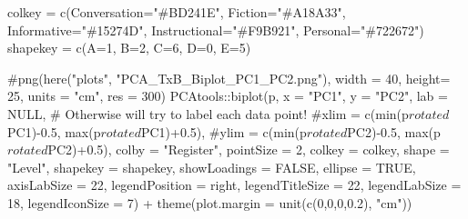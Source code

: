 \documentclass[
  letterpaper,
  DIV=11,
  numbers=noendperiod]{scrreprt}
\newenvironment{Shaded}{\begin{snugshade}}{\end{snugshade}}
\newcommand{\AttributeTok}[1]{\textcolor[rgb]{0.40,0.45,0.13}{#1}}
\newcommand{\CommentTok}[1]{\textcolor[rgb]{0.37,0.37,0.37}{#1}}
\newcommand{\ConstantTok}[1]{\textcolor[rgb]{0.56,0.35,0.01}{#1}}
\newcommand{\DecValTok}[1]{\textcolor[rgb]{0.68,0.00,0.00}{#1}}
\newcommand{\FloatTok}[1]{\textcolor[rgb]{0.68,0.00,0.00}{#1}}
\newcommand{\FunctionTok}[1]{\textcolor[rgb]{0.28,0.35,0.67}{#1}}
\newcommand{\NormalTok}[1]{\textcolor[rgb]{0.00,0.23,0.31}{#1}}
\newcommand{\OtherTok}[1]{\textcolor[rgb]{0.00,0.23,0.31}{#1}}
\newcommand{\SpecialCharTok}[1]{\textcolor[rgb]{0.37,0.37,0.37}{#1}}
\newcommand{\StringTok}[1]{\textcolor[rgb]{0.13,0.47,0.30}{#1}}
\begin{document}
\begin{Shaded}
\begin{Highlighting}[]
\NormalTok{colkey }\OtherTok{=} \FunctionTok{c}\NormalTok{(}\AttributeTok{Conversation=}\StringTok{"\#BD241E"}\NormalTok{, }\AttributeTok{Fiction=}\StringTok{"\#A18A33"}\NormalTok{, }\AttributeTok{Informative=}\StringTok{"\#15274D"}\NormalTok{, }\AttributeTok{Instructional=}\StringTok{"\#F9B921"}\NormalTok{, }\AttributeTok{Personal=}\StringTok{"\#722672"}\NormalTok{)}
\NormalTok{shapekey }\OtherTok{=} \FunctionTok{c}\NormalTok{(}\AttributeTok{A=}\DecValTok{1}\NormalTok{, }\AttributeTok{B=}\DecValTok{2}\NormalTok{, }\AttributeTok{C=}\DecValTok{6}\NormalTok{, }\AttributeTok{D=}\DecValTok{0}\NormalTok{, }\AttributeTok{E=}\DecValTok{5}\NormalTok{)}

\CommentTok{\#png(here("plots", "PCA\_TxB\_Biplot\_PC1\_PC2.png"), width = 40, height= 25, units = "cm", res = 300)}
\NormalTok{PCAtools}\SpecialCharTok{::}\FunctionTok{biplot}\NormalTok{(p,}
                 \AttributeTok{x =} \StringTok{"PC1"}\NormalTok{,}
                 \AttributeTok{y =} \StringTok{"PC2"}\NormalTok{,}
                 \AttributeTok{lab =} \ConstantTok{NULL}\NormalTok{, }\CommentTok{\# Otherwise will try to label each data point!}
                 \CommentTok{\#xlim = c(min(p$rotated$PC1){-}0.5, max(p$rotated$PC1)+0.5),}
                 \CommentTok{\#ylim = c(min(p$rotated$PC2){-}0.5, max(p$rotated$PC2)+0.5),}
                 \AttributeTok{colby =} \StringTok{"Register"}\NormalTok{,}
                 \AttributeTok{pointSize =} \DecValTok{2}\NormalTok{,}
                 \AttributeTok{colkey =}\NormalTok{ colkey,}
                 \AttributeTok{shape =} \StringTok{"Level"}\NormalTok{,}
                 \AttributeTok{shapekey =}\NormalTok{ shapekey,}
                 \AttributeTok{showLoadings =} \ConstantTok{FALSE}\NormalTok{,}
                 \AttributeTok{ellipse =} \ConstantTok{TRUE}\NormalTok{,}
                 \AttributeTok{axisLabSize =} \DecValTok{22}\NormalTok{,}
                 \AttributeTok{legendPosition =} \StringTok{\textquotesingle{}right\textquotesingle{}}\NormalTok{,}
                 \AttributeTok{legendTitleSize =} \DecValTok{22}\NormalTok{,}
                 \AttributeTok{legendLabSize =} \DecValTok{18}\NormalTok{, }
                 \AttributeTok{legendIconSize =} \DecValTok{7}\NormalTok{) }\SpecialCharTok{+}
  \FunctionTok{theme}\NormalTok{(}\AttributeTok{plot.margin =} \FunctionTok{unit}\NormalTok{(}\FunctionTok{c}\NormalTok{(}\DecValTok{0}\NormalTok{,}\DecValTok{0}\NormalTok{,}\DecValTok{0}\NormalTok{,}\FloatTok{0.2}\NormalTok{), }\StringTok{"cm"}\NormalTok{))}
\end{Highlighting}
\end{Shaded}
\end{document}
